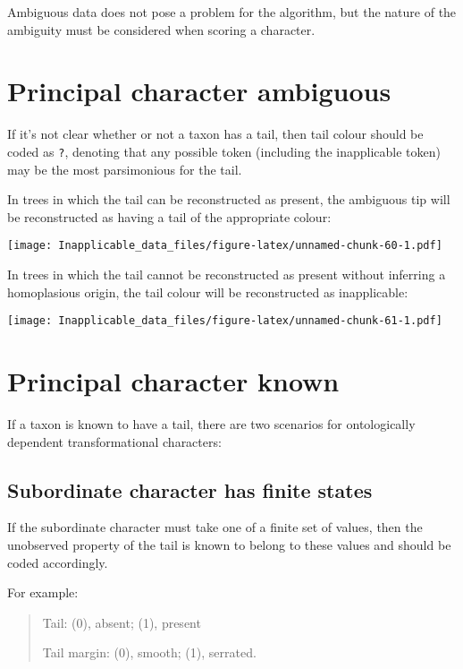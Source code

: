 \documentclass[]{book}
\theoremstyle{definition}
\theoremstyle{definition}
\theoremstyle{definition}
\theoremstyle{remark}
\begin{document}
Ambiguous data does not pose a problem for the algorithm, but the nature
of the ambiguity must be considered when scoring a character.

\hypertarget{principal-character-ambiguous}{%
\section{Principal character
ambiguous}\label{principal-character-ambiguous}}

If it's not clear whether or not a taxon has a tail, then tail colour
should be coded as \texttt{?}, denoting that any possible token
(including the inapplicable token) may be the most parsimonious for the
tail.

In trees in which the tail can be reconstructed as present, the
ambiguous tip will be reconstructed as having a tail of the appropriate
colour:

\texttt{[image: Inapplicable\_data\_files/figure-latex/unnamed-chunk-60-1.pdf]}

In trees in which the tail cannot be reconstructed as present without
inferring a homoplasious origin, the tail colour will be reconstructed
as inapplicable:

\texttt{[image: Inapplicable\_data\_files/figure-latex/unnamed-chunk-61-1.pdf]}

\hypertarget{principal-character-known}{%
\section{Principal character known}\label{principal-character-known}}

If a taxon is known to have a tail, there are two scenarios for
ontologically dependent transformational characters:

\hypertarget{subordinate-character-has-finite-states}{%
\subsection{Subordinate character has finite
states}\label{subordinate-character-has-finite-states}}

If the subordinate character must take one of a finite set of values,
then the unobserved property of the tail is known to belong to these
values and should be coded accordingly.

For example:

\begin{quote}
Tail: (0), absent; (1), present

Tail margin: (0), smooth; (1), serrated.
\end{quote}
\end{document}
